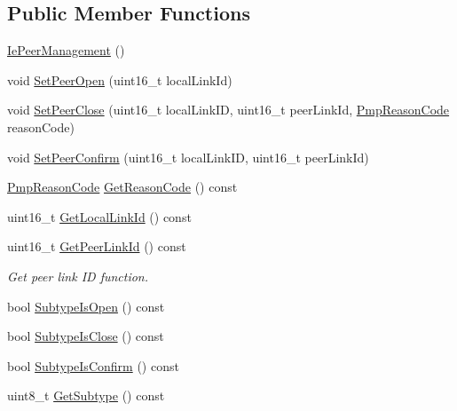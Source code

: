 \subsection*{Public Member Functions}
\begin{DoxyCompactItemize}
\item 
\hyperlink{classns3_1_1dot11s_1_1IePeerManagement_a98d3de641038b909be65e90d86cbea07}{Ie\+Peer\+Management} ()
\item 
void \hyperlink{classns3_1_1dot11s_1_1IePeerManagement_a8a148e933b7ea49cdad661f0d18357df}{Set\+Peer\+Open} (uint16\+\_\+t local\+Link\+Id)
\item 
void \hyperlink{classns3_1_1dot11s_1_1IePeerManagement_a9f112351e19200bcac0b8ca56c98ec0b}{Set\+Peer\+Close} (uint16\+\_\+t local\+Link\+ID, uint16\+\_\+t peer\+Link\+Id, \hyperlink{group__dot11s_ga1132ec5975c87960ceb86ea54481aba6}{Pmp\+Reason\+Code} reason\+Code)
\item 
void \hyperlink{classns3_1_1dot11s_1_1IePeerManagement_a74a7ff00dbc4a2bbe0bf28b746ffb53e}{Set\+Peer\+Confirm} (uint16\+\_\+t local\+Link\+ID, uint16\+\_\+t peer\+Link\+Id)
\item 
\hyperlink{group__dot11s_ga1132ec5975c87960ceb86ea54481aba6}{Pmp\+Reason\+Code} \hyperlink{classns3_1_1dot11s_1_1IePeerManagement_a4f85395e750e86d8de5ec7c16e2954f0}{Get\+Reason\+Code} () const 
\item 
uint16\+\_\+t \hyperlink{classns3_1_1dot11s_1_1IePeerManagement_a3d7e83a83a8ce984be51e4b8927be163}{Get\+Local\+Link\+Id} () const 
\item 
uint16\+\_\+t \hyperlink{classns3_1_1dot11s_1_1IePeerManagement_ace546d870df4ac4b92fd63ee96de11b1}{Get\+Peer\+Link\+Id} () const 
\begin{DoxyCompactList}\small\item\em Get peer link ID function. \end{DoxyCompactList}\item 
bool \hyperlink{classns3_1_1dot11s_1_1IePeerManagement_aaf7710a54a43bde5405533e5717af97c}{Subtype\+Is\+Open} () const 
\item 
bool \hyperlink{classns3_1_1dot11s_1_1IePeerManagement_ae91fc9d2a71faf83db5dfd7b82752264}{Subtype\+Is\+Close} () const 
\item 
bool \hyperlink{classns3_1_1dot11s_1_1IePeerManagement_a46f48869a567750773cc220b94d55c8e}{Subtype\+Is\+Confirm} () const 
\item 
uint8\+\_\+t \hyperlink{classns3_1_1dot11s_1_1IePeerManagement_a4cde62885c2619c05b5ba5024e7eb102}{Get\+Subtype} () const 

\end{DoxyCompactItemize}
